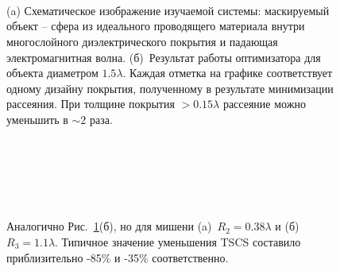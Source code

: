 \begin{figure}[p]
  \begin{minipage}[ht]{0.99\linewidth}
  \end{minipage}\\
  \vfill
  \begin{minipage}[ht]{0.99\linewidth}
  \end{minipage}\\
  \vfill
  \begin{minipage}[ht]{0.99\linewidth}
  \end{minipage}\\
  \vfill
  \begin{minipage}[ht]{0.99\linewidth}
  \end{minipage}
  \vfill

  \caption{(a) Схематическое изображение изучаемой системы:
    маскируемый объект -- сфера из идеального проводящего материала
    внутри многослойного диэлектрического покрытия и падающая
    электромагнитная волна. (б)~Результат работы оптимизатора для
    объекта диаметром $1.5\lambda$.  Каждая отметка на графике
    соответствует одному дизайну покрытия, полученному в результате
    минимизации рассеяния. При толщине покрытия $>0.15\lambda$
    рассеяние можно уменьшить в $\sim 2$ раза.}
  \label{img:scattering}  
\end{figure}

\begin{figure}[p]
  \begin{minipage}[ht]{0.99\linewidth}
  \end{minipage}\\
  \begin{minipage}[ht]{0.99\linewidth}
  \end{minipage}\\
  \vfill
  \begin{minipage}[ht]{0.99\linewidth}
  \end{minipage}\\
  \begin{minipage}[ht]{0.99\linewidth}
  \end{minipage}
  \vfill
  \caption{Аналогично Рис.~\ref{img:scattering}(б), но для мишени
    (a)~${R_2 = 0.38\lambda}$ и (б)~${R_3 = 1.1\lambda}$.  Типичное
    значение уменьшения TSCS составило приблизительно -85\% и -35\%
    соответственно.  \label{img:rcs-overview-r14-42}}%
\end{figure}


